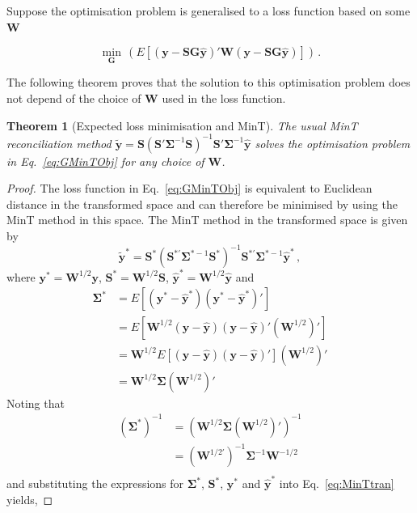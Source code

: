 \documentclass[12pt]{article}
\newtheorem{theo}{Theorem}[section]
\theoremstyle{definition}
\begin{document}
{Suppose the optimisation problem is generalised to a loss function based on some ${\bm W}$

{\color{blue}
	\begin{equation}
	\label{eq:GMinTObj}
	\underset{\bm{G}}{\min}\,(E\left[(\bm{y}-{\bm S}{\bm G}\hat{\bm{y}})'\bm{W}(\bm{y}-{\bm S}{\bm G}\hat{\bm{y}})\right])\,.
	\end{equation}
}

The following theorem proves that the solution to this optimisation problem does not depend of the choice of $\bm{W}$ used in the loss function.

\begin{theo}[Expected loss minimisation and MinT]\label{th:gmint}
    The usual MinT reconciliation method $\tilde{\bm{y}}=\bm{S}\left(\bm{S}'\bm{\Sigma}^{-1}\bm{S}\right)^{-1}\bm{S}'\bm{\Sigma}^{-1}\hat{\bm{y}}$ solves the optimisation problem in Eq.~\eqref{eq:GMinTObj} for any choice of $\bm{W}$.
\end{theo}
\begin{proof}
	The loss function in Eq.~\eqref{eq:GMinTObj} is equivalent to Euclidean distance in the transformed space and can therefore be minimised by using the MinT method in this space. The MinT method in the transformed space is given by
	\begin{equation}
	\label{eq:MinTtran}
	\tilde{\bm{y}}^{*}=\bm{S}^{*}\left(\bm{S}^{*'}\bm{\Sigma}^{*-1}\bm{S}^{*}\right)^{-1}\bm{S}^{*'}\bm{\Sigma}^{*-1}\hat{\bm{y}}^{*}\,,
	\end{equation}
	where  $\bm{y}^{*}=\bm{W}^{1/2}\bm{y}$, $\bm{S}^{*}=\bm{W}^{1/2}\bm{S}$, $\hat{\bm{y}}^{*}=\bm{W}^{1/2}\hat{\bm{y}}$ and
	\begin{align*}
	\bm{\Sigma}^*&=E\left[(\bm{y}^{*}-\hat{\bm{y}}^{*})(\bm{y}^{*}-\hat{\bm{y}}^{*})'\right]\\
	&=E\left[\bm{W}^{1/2}(\bm{y}-\hat{\bm{y}})(\bm{y}-\hat{\bm{y}})'(\bm{W}^{1/2})'\right]\\
	&=\bm{W}^{1/2}E\left[(\bm{y}-\hat{\bm{y}})(\bm{y}-\hat{\bm{y}})'\right](\bm{W}^{1/2})'\\
	&=\bm{W}^{1/2}\bm{\Sigma}(\bm{W}^{1/2})'
	\end{align*}
	Noting that
	\begin{align*}
	(\bm{\Sigma}^{*})^{-1}&=\left(\bm{W}^{1/2}\bm{\Sigma}(\bm{W}^{1/2})'\right)^{-1}\\
	&=(\bm{W}^{1/2'})^{-1}\bm{\Sigma}^{-1}\bm{W}^{-1/2}\\
	\end{align*}
	and substituting the expressions for $\bm{\Sigma}^*$, ${\bm{S}^*}$, $\bm{y}^{*}$ and $\hat{\bm{y}}^{*}$ into Eq.~\eqref{eq:MinTtran} yields,

\end{proof}}
\end{document}
